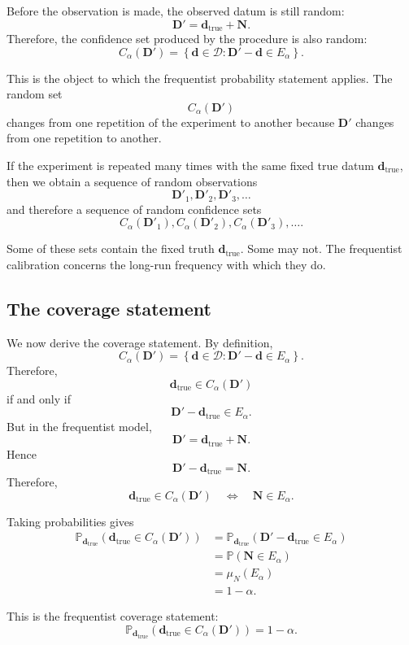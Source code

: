\documentclass[11pt]{article}
\newcommand{\Dspace}{\mathcal D}
\newcommand{\muN}{\mu_N}
\newcommand{\Dobsrand}{\mathbf D'}
\newcommand{\Nrand}{\mathbf N}
\newcommand{\dtrue}{\mathbf d_{\mathrm{true}}}
\newcommand{\Ealpha}{E_{\alpha}}
\newcommand{\Calpha}{C_{\alpha}}
\newcommand{\Prob}{\mathbb P}
\begin{document}
Before the observation is made, the observed datum is still random:
\[
    \Dobsrand=\dtrue+\Nrand.
\]
Therefore, the confidence set produced by the procedure is also random:
\[
    \Calpha(\Dobsrand)
    =
    \left\{
        \mathbf d\in\Dspace:
        \Dobsrand-\mathbf d\in\Ealpha
    \right\}.
\]

This is the object to which the frequentist probability statement applies. The random set
\[
    \Calpha(\Dobsrand)
\]
changes from one repetition of the experiment to another because \(\Dobsrand\) changes from one repetition to another.

If the experiment is repeated many times with the same fixed true datum \(\dtrue\), then we obtain a sequence of random observations
\[
    \Dobsrand_1,\Dobsrand_2,\Dobsrand_3,\dots
\]
and therefore a sequence of random confidence sets
\[
    \Calpha(\Dobsrand_1),
    \Calpha(\Dobsrand_2),
    \Calpha(\Dobsrand_3),
    \dots.
\]

Some of these sets contain the fixed truth \(\dtrue\). Some may not. The frequentist calibration concerns the long-run frequency with which they do.

\subsection{The coverage statement}

We now derive the coverage statement. By definition,
\[
    \Calpha(\Dobsrand)
    =
    \left\{
        \mathbf d\in\Dspace:
        \Dobsrand-\mathbf d\in\Ealpha
    \right\}.
\]
Therefore,
\[
    \dtrue\in\Calpha(\Dobsrand)
\]
if and only if
\[
    \Dobsrand-\dtrue\in\Ealpha.
\]
But in the frequentist model,
\[
    \Dobsrand=\dtrue+\Nrand.
\]
Hence
\[
    \Dobsrand-\dtrue=\Nrand.
\]
Therefore,
\[
    \dtrue\in\Calpha(\Dobsrand)
    \quad
    \Longleftrightarrow
    \quad
    \Nrand\in\Ealpha.
\]

Taking probabilities gives
\[
\begin{aligned}
    \Prob_{\dtrue}
    \left(
        \dtrue\in\Calpha(\Dobsrand)
    \right)
    &=
    \Prob_{\dtrue}
    \left(
        \Dobsrand-\dtrue\in\Ealpha
    \right)
    \\
    &=
    \Prob
    \left(
        \Nrand\in\Ealpha
    \right)
    \\
    &=
    \muN(\Ealpha)
    \\
    &=
    1-\alpha.
\end{aligned}
\]

This is the frequentist coverage statement:
\[
    \Prob_{\dtrue}
    \left(
        \dtrue\in\Calpha(\Dobsrand)
    \right)
    =
    1-\alpha.
\]
\end{document}
